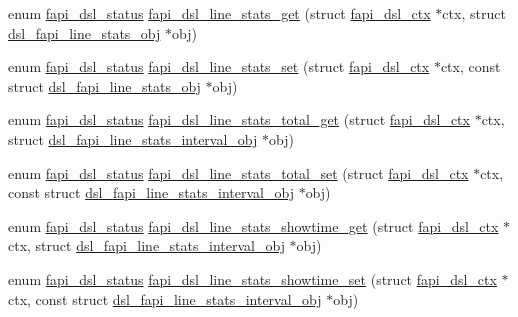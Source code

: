 \begin{DoxyCompactItemize}
\item 
enum \hyperlink{group__FAPI__DSL_ga6a68d961535e6f7aa239751763131a70}{fapi\-\_\-dsl\-\_\-status} \hyperlink{group__FAPI__DSL_ga8b69e9043c7560f016f288ff4d503cef}{fapi\-\_\-dsl\-\_\-line\-\_\-stats\-\_\-get} (struct \hyperlink{structfapi__dsl__ctx}{fapi\-\_\-dsl\-\_\-ctx} $\ast$ctx, struct \hyperlink{structdsl__fapi__line__stats__obj}{dsl\-\_\-fapi\-\_\-line\-\_\-stats\-\_\-obj} $\ast$obj)
\item 
enum \hyperlink{group__FAPI__DSL_ga6a68d961535e6f7aa239751763131a70}{fapi\-\_\-dsl\-\_\-status} \hyperlink{group__FAPI__DSL_ga7ce6e1d555dbdd48708d4b5f761998d9}{fapi\-\_\-dsl\-\_\-line\-\_\-stats\-\_\-set} (struct \hyperlink{structfapi__dsl__ctx}{fapi\-\_\-dsl\-\_\-ctx} $\ast$ctx, const struct \hyperlink{structdsl__fapi__line__stats__obj}{dsl\-\_\-fapi\-\_\-line\-\_\-stats\-\_\-obj} $\ast$obj)
\item 
enum \hyperlink{group__FAPI__DSL_ga6a68d961535e6f7aa239751763131a70}{fapi\-\_\-dsl\-\_\-status} \hyperlink{group__FAPI__DSL_ga5df23a7c34a81f29959eadae638d8464}{fapi\-\_\-dsl\-\_\-line\-\_\-stats\-\_\-total\-\_\-get} (struct \hyperlink{structfapi__dsl__ctx}{fapi\-\_\-dsl\-\_\-ctx} $\ast$ctx, struct \hyperlink{structdsl__fapi__line__stats__interval__obj}{dsl\-\_\-fapi\-\_\-line\-\_\-stats\-\_\-interval\-\_\-obj} $\ast$obj)
\item 
enum \hyperlink{group__FAPI__DSL_ga6a68d961535e6f7aa239751763131a70}{fapi\-\_\-dsl\-\_\-status} \hyperlink{group__FAPI__DSL_ga69af95fa3467bad5acdb5d4156b379d4}{fapi\-\_\-dsl\-\_\-line\-\_\-stats\-\_\-total\-\_\-set} (struct \hyperlink{structfapi__dsl__ctx}{fapi\-\_\-dsl\-\_\-ctx} $\ast$ctx, const struct \hyperlink{structdsl__fapi__line__stats__interval__obj}{dsl\-\_\-fapi\-\_\-line\-\_\-stats\-\_\-interval\-\_\-obj} $\ast$obj)
\item 
enum \hyperlink{group__FAPI__DSL_ga6a68d961535e6f7aa239751763131a70}{fapi\-\_\-dsl\-\_\-status} \hyperlink{group__FAPI__DSL_ga20bb0212d6e16d711068b1c99803eb62}{fapi\-\_\-dsl\-\_\-line\-\_\-stats\-\_\-showtime\-\_\-get} (struct \hyperlink{structfapi__dsl__ctx}{fapi\-\_\-dsl\-\_\-ctx} $\ast$ctx, struct \hyperlink{structdsl__fapi__line__stats__interval__obj}{dsl\-\_\-fapi\-\_\-line\-\_\-stats\-\_\-interval\-\_\-obj} $\ast$obj)
\item 
enum \hyperlink{group__FAPI__DSL_ga6a68d961535e6f7aa239751763131a70}{fapi\-\_\-dsl\-\_\-status} \hyperlink{group__FAPI__DSL_ga4dd2db2d5055e8d393f0683b286ac883}{fapi\-\_\-dsl\-\_\-line\-\_\-stats\-\_\-showtime\-\_\-set} (struct \hyperlink{structfapi__dsl__ctx}{fapi\-\_\-dsl\-\_\-ctx} $\ast$ctx, const struct \hyperlink{structdsl__fapi__line__stats__interval__obj}{dsl\-\_\-fapi\-\_\-line\-\_\-stats\-\_\-interval\-\_\-obj} $\ast$obj)

\end{DoxyCompactItemize}
